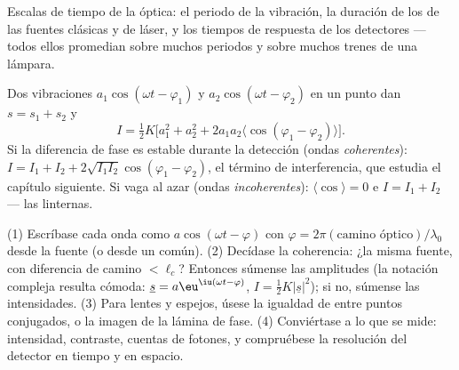 \begin{omfigure}

{\small Escalas de tiempo de la óptica: el periodo de la vibración, la
duración de los  de las fuentes clásicas y de láser, y los
tiempos de respuesta de los detectores --- todos ellos promedian sobre muchos
periodos y sobre muchos trenes de una lámpara.}
\end{omfigure}

\begin{remark}\label{rem:b2:scalar-light-model:superposition}
Dos vibraciones $a_1\cos(\omega t - \varphi_1)$ y $a_2\cos(\omega t - \varphi_2)$ en un
punto dan $s = s_1 + s_2$ y
\[
I = \tfrac12K\bigl[a_1^2 + a_2^2 + 2a_1a_2\langle\cos(\varphi_1 - \varphi_2)\rangle\bigr] .
\]
Si la diferencia de fase es estable durante la detección
(ondas \emph{coherentes}): $I = I_1 + I_2 + 2\sqrt{I_1I_2}\cos(\varphi_1 - \varphi_2)$,
el término de interferencia, que estudia el capítulo siguiente. Si vaga
al azar (ondas \emph{incoherentes}): $\langle\cos\rangle = 0$ e $I = I_1 +
I_2$ --- las linternas.
\end{remark}

\begin{method}\label{met:b2:scalar-light-model:method}
(1) Escríbase cada onda como $a\cos(\omega t - \varphi)$ con $\varphi = 2\pi(\text{camino
óptico})/\lambda_0$ desde la fuente (o desde un  común). (2) Decídase
la coherencia: ¿la misma fuente, con diferencia de camino $< \ell_c$? Entonces súmense las amplitudes
(la notación compleja resulta cómoda: $\underline s = a\eu^{\iu(\omega t - \varphi)}$, $I =
\tfrac12K|\underline s|^2$); si no, súmense las intensidades. (3) Para lentes y
espejos, úsese la igualdad de  entre puntos conjugados, o la
imagen de la lámina de fase. (4) Conviértase a lo que se mide: intensidad,
contraste, cuentas de fotones, y compruébese la resolución del detector en tiempo
y en espacio.
\end{method}

